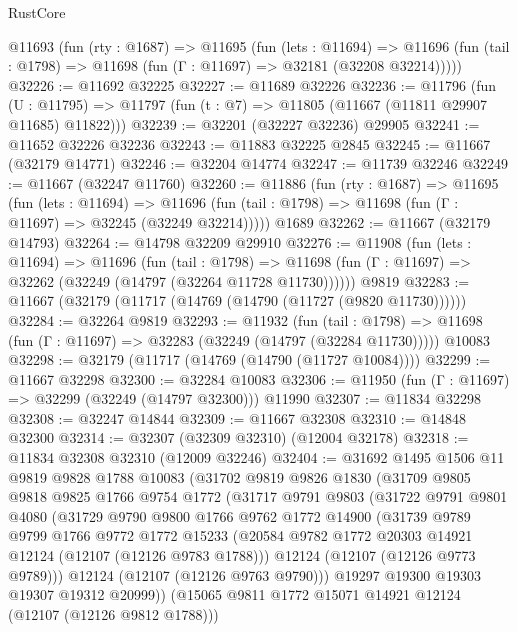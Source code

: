 \begin{lexlean}{RustCore}
\begin{coremodule}
  @11693
    (fun (rty : @1687) =>
    @11695
      (fun (lets : @11694) =>
      @11696 (fun (tail : @1798) => @11698 (fun (Γ : @11697) => @32181 (@32208 @32214)))))
@32226 := @11692 @32225
@32227 := @11689 @32226
@32236 := @11796
    (fun (U : @11795) => @11797 (fun (t : @7) => @11805 (@11667 (@11811 @29907 @11685) @11822)))
@32239 := @32201 (@32227 @32236) @29905
@32241 := @11652 @32226 @32236
@32243 := @11883 @32225 @2845
@32245 := @11667 (@32179 @14771)
@32246 := @32204 @14774
@32247 := @11739 @32246
@32249 := @11667 (@32247 @11760)
@32260 := @11886
    (fun (rty : @1687) =>
    @11695
      (fun (lets : @11694) =>
      @11696 (fun (tail : @1798) => @11698 (fun (Γ : @11697) => @32245 (@32249 @32214)))))
    @1689
@32262 := @11667 (@32179 @14793)
@32264 := @14798 @32209 @29910
@32276 := @11908
    (fun (lets : @11694) =>
    @11696
      (fun (tail : @1798) =>
      @11698 (fun (Γ : @11697) => @32262 (@32249 (@14797 (@32264 @11728 @11730))))))
    @9819
@32283 := @11667 (@32179 (@11717 (@14769 (@14790 (@11727 (@9820 @11730))))))
@32284 := @32264 @9819
@32293 := @11932
    (fun (tail : @1798) => @11698 (fun (Γ : @11697) => @32283 (@32249 (@14797 (@32284 @11730)))))
    @10083
@32298 := @32179 (@11717 (@14769 (@14790 (@11727 @10084))))
@32299 := @11667 @32298
@32300 := @32284 @10083
@32306 := @11950 (fun (Γ : @11697) => @32299 (@32249 (@14797 @32300))) @11990
@32307 := @11834 @32298
@32308 := @32247 @14844
@32309 := @11667 @32308
@32310 := @14848 @32300
@32314 := @32307 (@32309 @32310) (@12004 @32178)
@32318 := @11834 @32308 @32310 (@12009 @32246)
@32404 := @31692
    @1495
    @1506
    @11
    @9819
    @9828
    @1788
    @10083
    (@31702
      @9819
      @9826
      @1830
      (@31709
        @9805
        @9818
        @9825
        @1766
        @9754
        @1772
        (@31717
          @9791
          @9803
          (@31722
            @9791
            @9801
            @4080
            (@31729
              @9790
              @9800
              @1766
              @9762
              @1772
              @14900
              (@31739
                @9789
                @9799
                @1766
                @9772
                @1772
                @15233
                (@20584 @9782 @1772 @20303 @14921 @12124 (@12107 (@12126 @9783 @1788)))
                @12124
                (@12107 (@12126 @9773 @9789)))
              @12124
              (@12107 (@12126 @9763 @9790)))
            @19297
            @19300
            @19303
            @19307
            @19312
            @20999))
        (@15065 @9811 @1772 @15071 @14921 @12124 (@12107 (@12126 @9812 @1788)))

\end{coremodule}
\end{lexlean}
